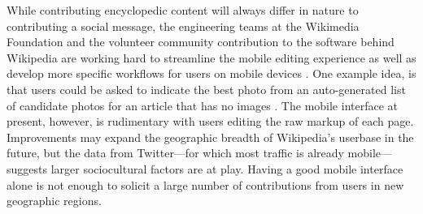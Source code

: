 \documentclass{sigchi}
\begin{document}
While contributing encyclopedic content will always differ in nature to contributing a social message, the engineering teams at the Wikimedia Foundation and the volunteer community contribution to the software behind Wikipedia are working hard to streamline the mobile editing experience as well as develop more specific workflows for users on mobile devices \cite{sneller2014}. One example idea, is that users could be asked to indicate the best photo from an auto-generated list of candidate photos for an article that has no images \cite{sneller2014}. The mobile interface at present, however, is rudimentary with users editing the raw markup of each page. Improvements may expand the geographic breadth of Wikipedia's userbase in the future, but the data from Twitter---for which most traffic is already mobile---suggests larger sociocultural factors are at play. Having a good mobile interface alone is not enough to solicit a large number of contributions from users in new geographic regions.






\end{document}
